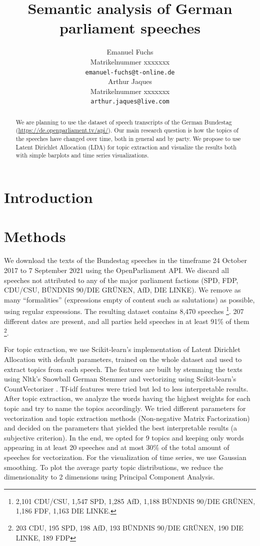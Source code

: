 \documentclass{article}
\title{Semantic analysis of German parliament speeches}
\author{%
  Emanuel Fuchs\\
  Matrikelnummer xxxxxxx\\
  \texttt{emanuel-fuchs@t-online.de} \\
  \And
  Arthur Jaques\\
  Matrikelnummer xxxxxxx\\
  \texttt{arthur.jaques@live.com} \\
}
\begin{document}
\maketitle

\begin{abstract}
  We are planning to use the dataset of speech transcripts of the German Bundestag (\url{https://de.openparliament.tv/api/}).
  Our main research question is how the topics of the speeches have changed over time, both in general and by party.
  We propose to use Latent Dirichlet Allocation (LDA) for topic extraction and visualize the results both with simple barplots and time series visualizations.
\end{abstract}

\section{Introduction}

\section{Methods}
We download the texts of the Bundestag speeches in the timeframe 24 October 2017 to 7 September 2021 using the OpenParliament \cite{OpenParliamentTV} API.
We discard all speeches not attributed to any of the major parliament factions (SPD, FDP, CDU/CSU, BÜNDNIS 90/DIE GRÜNEN, AfD, DIE LINKE).
We remove as many ``formalities'' (expressions empty of content such as salutations) as possible, using regular expressions.
The resulting dataset contains 8,470 speeches
\footnote{2,101 CDU/CSU, 1,547 SPD, 1,285 AfD, 1,188 BÜNDNIS 90/DIE GRÜNEN, 1,186 FDF, 1,163 DIE LINKE.}.
207 different dates are present, and all parties held speeches in at least 91\% of them
\footnote{203 CDU, 195 SPD, 198 AfD, 193 BÜNDNIS 90/DIE GRÜNEN, 190 DIE LINKE, 189 FDP}.

For topic extraction, we use Scikit-learn's \cite{Scikit-learn} implementation of Latent Dirichlet Allocation with default parameters,  trained on the whole dataset and used to extract topics from each speech.
The features are built by stemming the texts using Nltk's \cite{Nltk} Snowball German Stemmer and vectorizing using Scikit-learn's CountVectorizer \cite{Scikit-learn}.
Tf-idf features were tried but led to less interpretable results.
After topic extraction, we analyze the words having the highest weights for each topic and try to name the topics accordingly.
We tried different parameters for vectorization and topic extraction methods (Non-negative Matrix Factorization) and decided on the parameters that yielded the best interpretable results (a subjective criterion).
In the end, we opted for 9 topics and keeping only words appearing in at least 20 speeches and at most 30\% of the total amount of speeches for vectorization.
For the visualization of time series, we use Gaussian smoothing.
To plot the average party topic distributions, we reduce the dimensionality to 2 dimensions using Principal Component Analysis.
\end{document}
